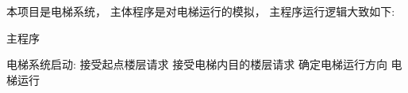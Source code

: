 \documentclass[../main.tex]{subfiles} %
\begin{document}
本项目是电梯系统，
主体程序是对电梯运行的模拟，
主程序运行逻辑大致如下:

\begin{algorithm}[H]
  \caption{主程序}
  \begin{codebox}
      \li \While 电梯系统启动:
      \Then
        \li 接受起点楼层请求
        \li 接受电梯内目的楼层请求
        \li 确定电梯运行方向
        \li 电梯运行
      \End
  \end{codebox}
  \label{alg:main}
\end{algorithm}
\end{document}
